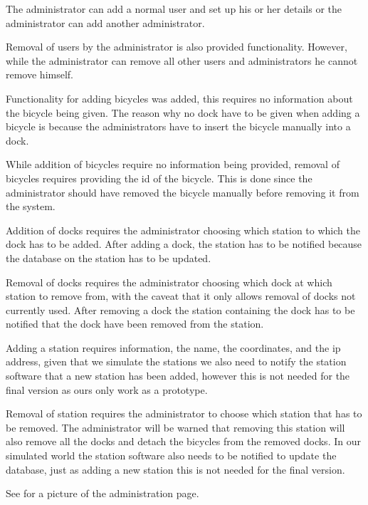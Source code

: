 \begin{description}[style=nextline]
\item[Add User] The administrator can add a normal user and set up his or her details or the administrator can add another administrator.
\item[Remove User] Removal of users by the administrator is also provided functionality.
However, while the administrator can remove all other users and administrators he cannot remove himself.
\item[Add Bicycle] Functionality for adding bicycles was added, this requires no information about the bicycle being given.
The reason why no  dock have to be given when adding a bicycle is because the administrators have to insert the bicycle manually into a dock.
\item[Remove Bicycle] While addition of bicycles require no information being provided, removal of bicycles requires providing the id of the bicycle.
This is done since the administrator should have removed the bicycle manually before removing it from the system.
\item[Add Dock] Addition of docks requires the administrator choosing which station to which the dock has to be added.
After adding a dock, the station has to be notified because the database on the station has to be updated.
\item[Remove Dock] Removal of docks requires the administrator choosing which dock at which station to remove from, with the caveat that it only allows removal of docks not currently used.
After removing a dock the station containing the dock has to be notified that the dock have been removed from the station.
\item[Add Station] Adding a station requires information, the name, the coordinates, and the ip address, given that we simulate the stations we also need to notify the station software that a new station has been added, however this is not needed for the final version as ours only work as a prototype.
\item[Remove Station] Removal of station requires the administrator to choose which station that has to be removed.
The administrator will be warned that removing this station will also remove all the docks and detach the bicycles from the removed docks.
In our simulated world the station software also needs to be notified to update the database, just as adding a new station this is not needed for the final version.
\end{description}
See  for a picture of the administration page.